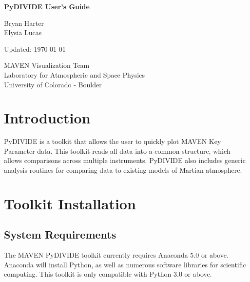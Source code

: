 \documentclass{article}
\begin{document}
\begin{titlepage}
    \begin{center}
        \vspace*{3cm}
        
        \textbf{\LARGE{PyDIVIDE User's Guide}}
        
        
        \vspace{1cm}
        
        \textnormal{\large{Bryan Harter\\Elysia Lucas}}
        \vspace{0.5cm}
        
        \textnormal{Updated: \today}

        \vfill
        
        \vspace{0.8cm}
        
        MAVEN Visualization Team\\
        Laboratory for Atmospheric and Space Physics\\
        University of Colorado - Boulder
        
        
    \end{center}
\end{titlepage}


\tableofcontents

\newpage
\section{Introduction}
\overfullrule=0pt
PyDIVIDE is a toolkit that allows the user to quickly plot MAVEN Key Parameter data. This toolkit reads all data into a common structure, which allows comparisons across multiple instruments. PyDIVIDE also includes generic analysis routines for comparing data to existing models of Martian atmosphere.

\section{Toolkit Installation}
\subsection{System Requirements}
\overfullrule=0pt
The MAVEN PyDIVIDE toolkit currently requires Anaconda 5.0 or above. Anaconda will install Python, as well as numerous software libraries for scientific computing. This toolkit is only compatible with Python 3.0 or above.
\end{document}
